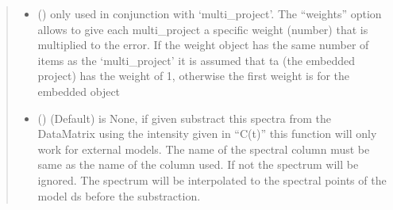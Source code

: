 \documentclass[letterpaper,10pt,english]{sphinxmanual}
\begin{document}
\begin{fulllineitems}
\begin{quote}
\begin{description}
\begin{itemize}
\item {} 
 (\sphinxstyleliteralemphasis{\sphinxupquote{, }}) \textendash{} only used in conjunction with ‘multi\_project’. The “weights” option allows to
give each multi\_project a specific weight (number) that is multiplied to the error.
If the weight object has the same number of items as the ‘multi\_project’ it is assumed
that ta (the embedded project) has the weight of 1, otherwise the first weight is for the
embedded object

\item {} 
 (\sphinxstyleliteralemphasis{\sphinxupquote{, }}) \textendash{} (Default) is None, if given substract this spectra from the DataMatrix using the intensity
given in “C(t)” this function will only work for external models. The name of the spectral column
must be same as the name of the column used. If not the spectrum will be ignored. The spectrum will
be interpolated to the spectral points of the model ds before the substraction.

\end{itemize}

\end{description}\end{quote}

\end{fulllineitems}

\end{document}
